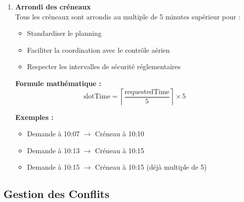 \documentclass[12pt,a4paper]{article}
\begin{document}
\begin{enumerate}[leftmargin=*, label=\textcolor{primaryblue}{\textbf{\arabic*.}}]
    \item \textbf{Arrondi des créneaux}\\
    Tous les créneaux sont arrondis au multiple de 5 minutes supérieur pour :
    \begin{itemize}
        \item Standardiser le planning
        \item Faciliter la coordination avec le contrôle aérien
        \item Respecter les intervalles de sécurité réglementaires
    \end{itemize}

    \textbf{Formule mathématique :}
    $$\text{slotTime} = \left\lceil \frac{\text{requestedTime}}{5} \right\rceil \times 5$$

    \textbf{Exemples :}
    \begin{itemize}
        \item Demande à 10:07 $\rightarrow$ Créneau à 10:10
        \item Demande à 10:13 $\rightarrow$ Créneau à 10:15
        \item Demande à 10:15 $\rightarrow$ Créneau à 10:15 (déjà multiple de 5)
    \end{itemize}
\end{enumerate}

\subsection{Gestion des Conflits}
\end{document}
